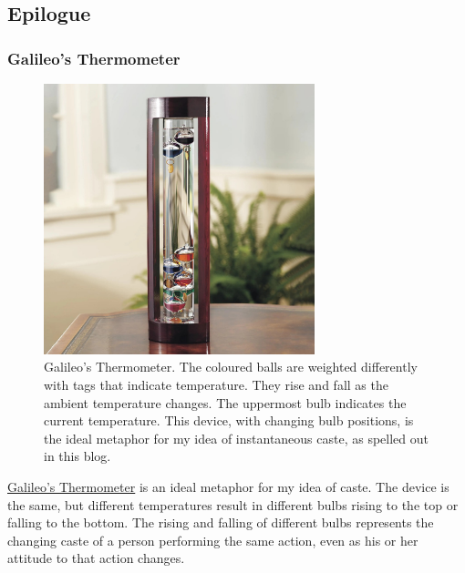 \documentclass[
  a4paper,
]{article}
\begin{document}
\subsection{Epilogue}\label{epilogue}

\subsubsection{Galileo's Thermometer}\label{galileos-thermometer}

\begin{figure}
\centering
\includegraphics[width=0.7\textwidth,height=\textheight]{images/galileo-thermometer.jpg}
\caption[Galileo's Thermometer. The coloured balls are weighted
differently with tags that indicate temperature. They rise and fall as
the ambient temperature changes. The uppermost bulb indicates the
current temperature. This device, with changing bulb positions, is the
ideal metaphor for my idea of instantaneous caste, as spelled out in
this blog.]{Galileo's Thermometer. The coloured balls are weighted
differently with tags that indicate temperature. They rise and fall as
the ambient temperature changes. The uppermost bulb indicates the
current temperature. This device, with changing bulb positions, is the
ideal metaphor for my idea of instantaneous caste, as spelled out in
this blog.\footnotemark{}}\label{fig:galileo}
\end{figure}

\href{https://en.wikipedia.org/wiki/Galileo_thermometer}{Galileo's
Thermometer} is an ideal metaphor for my idea of caste. The device is
the same, but different temperatures result in different bulbs rising to
the top or falling to the bottom. The rising and falling of different
bulbs represents the changing caste of a person performing the same
action, even as his or her attitude to that action changes.
\end{document}
